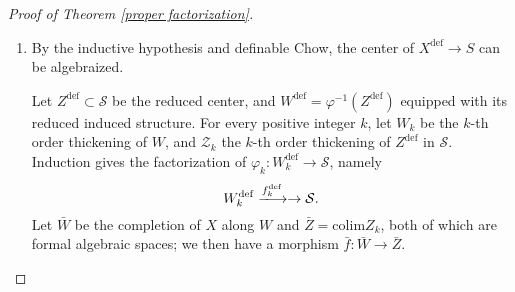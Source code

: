 \documentclass{amsart}
\theoremstyle{definition}
\numberwithin{equation}{section}
\newcommand{\definable}{\mathrm{def}}
\begin{document}
\begin{proof}[Proof of Theorem \ref{proper factorization}]
\begin{enumerate}
		      Obviously $\mathrm{Hilb}(X_{\mathcal{U}})$ is an open subset of $\mathrm{Hilb}(X)$.
		      Let $B$ be the closure of the image of $U$ in $\mathrm{Hilb}(X)$,
		      $V_B \to B$ the restriction of the universal family,
		      $\widetilde{B} \to B$ the normalization,
		      and $V_{\widetilde{B}}\to B$ the base-change of the universal family. We then have solid diagrams
		      \[\begin{tikzcd}[sep = small]
				      &                           & V_{\widetilde{B}} \arrow[ld] \arrow[rd] &                          &  &                         & (V_{\widetilde{B}})^\definable \arrow[ld] \arrow[rd] \arrow[dd] &                                                     \\
				      & V_B \arrow[rd] \arrow[ld] &                                         & \widetilde{B} \arrow[ld] &  & X^\definable \arrow[rd] &                                                                 & \widetilde{B}^\definable \arrow[ld, "\psi", dashed] \\
				      X &                           & B                                       &                          &  &                         & \mathcal{S}                                                     &
			      \end{tikzcd}\]
		      The resulting morphism $\psi$ is a proper modification, as it is proper
		      ($(V_{\widetilde{B}})^\definable$ $\to \mathcal{S}$ is proper and $V_{\widetilde{B}}\to \widetilde{B}$ is surjective)
		      and an isomorphism over $\mathcal{U}$.

		\item
		      By the inductive hypothesis and definable Chow, the center of $X^\definable \to S$ can be algebraized.

		      Let $Z^\definable \subset \mathcal{S}$ be the reduced center, and $W^\definable = \varphi^{-1}(Z^\definable)$
		      equipped with its reduced induced structure.
		      For every positive integer $k$, let $W_k$ be the $k$-th order thickening of $W$,
		      and $\mathcal{Z}_k$ the $k$-th order thickening of $Z^\definable$ in $\mathcal{S}$.
		      Induction gives the factorization of $\varphi_k: W_k^\definable \to \mathcal{S}$, namely
		      \[
			      W_k^\definable  \xlongrightarrow{f_k^\definable} \to \mathcal{S}.
		      \]
		      Let $\bar{W}$ be the completion of $X$ along $W$ and $\bar{Z} = \mathrm{colim} Z_k$,
		      both of which are formal algebraic spaces; we then have a morphism $\bar{f}: \bar{W} \to \bar{Z}$.


\end{enumerate}
\end{proof}
\end{document}
